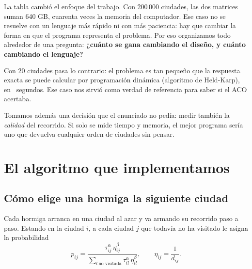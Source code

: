 \documentclass[11pt,a4paper]{article}
\begin{document}
La tabla cambió el enfoque del trabajo. Con 200\,000 ciudades, las dos matrices
suman 640 GB, cuarenta veces la memoria del computador. Ese caso no se resuelve
con un lenguaje más rápido ni con más paciencia: hay que cambiar la forma en que el
programa representa el problema. Por eso organizamos todo alrededor de una pregunta:
\textbf{¿cuánto se gana cambiando el diseño, y cuánto cambiando el lenguaje?}

Con 20 ciudades pasa lo contrario: el problema es tan pequeño que la respuesta
exacta se puede calcular por programación dinámica (algoritmo de Held-Karp), en
\TiempoHK\ segundos. Ese caso nos sirvió como verdad de referencia para saber si el ACO
acertaba.

Tomamos además una decisión que el enunciado no pedía: medir también la
\emph{calidad} del recorrido. Si solo se mide tiempo y memoria, el mejor programa
sería uno que devuelva cualquier orden de ciudades sin pensar.

\section{El algoritmo que implementamos}

\subsection{Cómo elige una hormiga la siguiente ciudad}

Cada hormiga arranca en una ciudad al azar y va armando su recorrido paso a paso.
Estando en la ciudad $i$, a cada ciudad $j$ que todavía no ha visitado le asigna la
probabilidad
\begin{equation}
p_{ij}=\frac{\tau_{ij}^{\alpha}\,\eta_{ij}^{\beta}}{\displaystyle\sum_{l\ \text{no visitada}}\tau_{il}^{\alpha}\,\eta_{il}^{\beta}},
\qquad \eta_{ij}=\frac{1}{d_{ij}} .
\label{eq:regla}
\end{equation}
\end{document}
